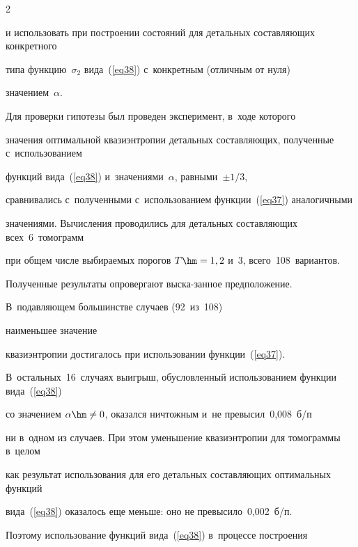 \begin{multicols}{2}
\vspace*{-1pt}



\noindent

и использовать при построении состояний для детальных составляющих конкретного 

типа функцию~$\sigma_2$  вида~(\ref{eq38}) с~конкретным (отличным от нуля) 

значением~$\alpha$.



Для проверки гипотезы был проведен эксперимент, в~ходе которого 

значения оптимальной квазиэнтропии детальных составляющих, полученные с~использованием

 функций вида~(\ref{eq38}) и~значениями~$\alpha$, равными~$\pm1/3$, 

 сравнивались с~полученными с~использованием функции~(\ref{eq37}) аналогичными 

 значениями. Вычисления проводились для детальных составляющих всех~6~томограмм 

 при общем числе выбираемых порогов  $T\hm=1,2$ и~3, всего~108~вариантов. 

 Полученные результаты опровергают выска-\linebreak занное предположение. 

 В~подавляющем большинстве случаев (92~из~108) 

 наименьшее значение\linebreak\vspace*{-12pt}

 

 \columnbreak

 

 \noindent

 квазиэнтропии достигалось при использовании функции~(\ref{eq37}). 

 В~остальных~16~случаях выигрыш, обусловленный использованием функции вида~(\ref{eq38}) 

 со значением $\alpha\hm\neq 0$, оказался ничтожным и~не превысил~0,008~б/п 

 ни в~одном из случаев. При этом уменьшение квазиэнтропии для томограммы в~целом 

 как результат использования для его детальных составляющих оптимальных функций 

 вида~(\ref{eq38}) оказалось еще меньше: оно не превысило~0,002~б/п. 

 Поэтому использование функций вида~(\ref{eq38}) в~процессе построения 


\end{multicols}
